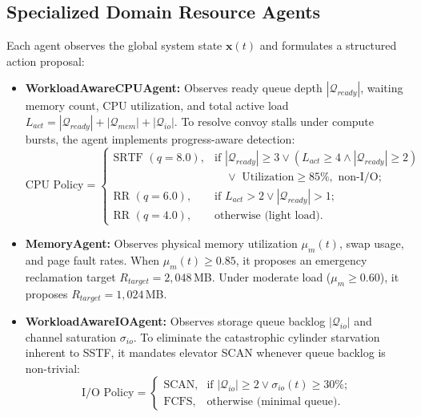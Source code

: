 \documentclass[conference]{IEEEtran}
\begin{document}
\subsection{Specialized Domain Resource Agents}
Each agent observes the global system state $\mathbf{x}(t)$ and formulates a structured action proposal:
\begin{itemize}
    \item \textbf{WorkloadAwareCPUAgent:} Observes ready queue depth $|\mathcal{Q}_{ready}|$, waiting memory count, CPU utilization, and total active load $L_{act} = |\mathcal{Q}_{ready}| + |\mathcal{Q}_{mem}| + |\mathcal{Q}_{io}|$. To resolve convoy stalls under compute bursts, the agent implements progress-aware detection:
    \begin{equation}
        \text{CPU Policy} = \begin{cases}
            \text{SRTF } (q=8.0), & \text{if } |\mathcal{Q}_{ready}| \ge 3 \lor (L_{act} \ge 4 \land |\mathcal{Q}_{ready}| \ge 2) \\
            & \quad \lor \text{ Utilization} \ge 85\%, \text{ non-I/O}; \\
            \text{RR } (q=6.0), & \text{if } L_{act} > 2 \lor |\mathcal{Q}_{ready}| > 1; \\
            \text{RR } (q=4.0), & \text{otherwise (light load)}.
        \end{cases}
    \end{equation}
    \item \textbf{MemoryAgent:} Observes physical memory utilization $\mu_m(t)$, swap usage, and page fault rates. When $\mu_m(t) \ge 0.85$, it proposes an emergency reclamation target $R_{target} = 2,048$\,MB. Under moderate load ($\mu_m \ge 0.60$), it proposes $R_{target} = 1,024$\,MB.
    \item \textbf{WorkloadAwareIOAgent:} Observes storage queue backlog $|\mathcal{Q}_{io}|$ and channel saturation $\sigma_{io}$. To eliminate the catastrophic cylinder starvation inherent to SSTF, it mandates elevator SCAN whenever queue backlog is non-trivial:
    \begin{equation}
        \text{I/O Policy} = \begin{cases}
            \text{SCAN}, & \text{if } |\mathcal{Q}_{io}| \ge 2 \lor \sigma_{io}(t) \ge 30\%; \\
            \text{FCFS}, & \text{otherwise (minimal queue)}.
        \end{cases}
    \end{equation}
\end{itemize}
\end{document}
